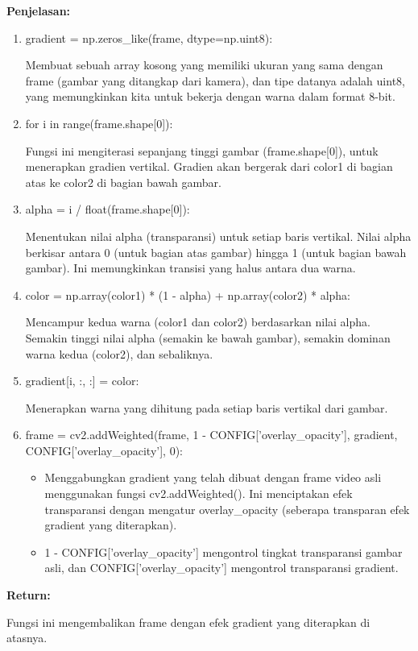 \documentclass[11pt,a4paper]{article}
\begin{document}
\textbf{Penjelasan:}
\begin{enumerate}
    \item gradient = np.zeros\_like(frame, dtype=np.uint8):  
    
    Membuat sebuah array kosong yang memiliki ukuran yang sama dengan frame (gambar yang ditangkap dari kamera), dan tipe datanya adalah uint8, yang memungkinkan kita untuk bekerja dengan warna dalam format 8-bit.
    \item for i in range(frame.shape[0]):  
    
Fungsi ini mengiterasi sepanjang tinggi gambar (frame.shape[0]), untuk menerapkan gradien vertikal. Gradien akan bergerak dari color1 di bagian atas ke color2 di bagian bawah gambar.
    \item alpha = i / float(frame.shape[0]):  
    
    Menentukan nilai alpha (transparansi) untuk setiap baris vertikal. Nilai alpha berkisar antara 0 (untuk bagian atas gambar) hingga 1 (untuk bagian bawah gambar). Ini memungkinkan transisi yang halus antara dua warna.
    \item color = np.array(color1) * (1 - alpha) + np.array(color2) * alpha: 
    
    Mencampur kedua warna (color1 dan color2) berdasarkan nilai alpha. Semakin tinggi nilai alpha (semakin ke bawah gambar), semakin dominan warna kedua (color2), dan sebaliknya.
    \item gradient[i, :, :] = color:  
    
    Menerapkan warna yang dihitung pada setiap baris vertikal dari gambar.
    \item frame = cv2.addWeighted(frame, 1 - CONFIG['overlay\_opacity'], gradient, CONFIG['overlay\_opacity'], 0): 
    \begin{itemize}
        \item Menggabungkan gradient yang telah dibuat dengan frame video asli menggunakan fungsi cv2.addWeighted(). Ini menciptakan efek transparansi dengan mengatur overlay\_opacity (seberapa transparan efek gradient yang diterapkan).
        \item 1 - CONFIG['overlay\_opacity'] mengontrol tingkat transparansi gambar asli, dan CONFIG['overlay\_opacity'] mengontrol transparansi gradient.
    \end{itemize}
\end{enumerate}

\textbf{Return:}

Fungsi ini mengembalikan frame dengan efek gradient yang diterapkan di atasnya.
\end{document}
